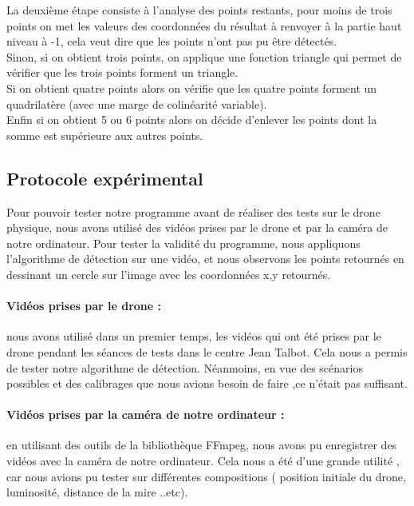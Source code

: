 \documentclass[12pt]{article}
\begin{document}
\begin{enumerate}
La deuxième étape consiste à l'analyse des points restants, pour moins de trois points on met les valeurs des coordonnées du résultat à renvoyer à la partie haut niveau à -1, cela veut dire que les points n'ont pas pu être détectés.\\
Sinon, si on obtient trois points, on applique une fonction triangle qui permet de vérifier que les trois points forment un triangle.\\
Si on obtient quatre points alors on vérifie que les quatre points forment un quadrilatère (avec une marge de colinéarité variable).\\ Enfin si on obtient 5 ou 6 points alors on décide d'enlever les points dont la somme est supérieure aux autres points.  

\end{enumerate}

\subsection{Protocole expérimental}
Pour pouvoir tester notre programme avant de réaliser des tests sur le drone physique, nous avons utilisé des vidéos prises par le drone et par la caméra de notre ordinateur. Pour tester la validité du programme, nous appliquons l'algorithme de détection sur une vidéo, et nous observons les points retournés en dessinant un cercle sur l'image avec les coordonnées x,y retournés.

\paragraph*{Vidéos prises par le drone : }
nous avons utilisé dans un premier temps, les vidéos qui ont été prises par le drone pendant les séances de tests dans le centre Jean Talbot. Cela nous a permis de tester notre algorithme de détection. Néanmoins, en vue des scénarios possibles et des calibrages que nous avions besoin de faire ,ce n'était pas suffisant. 

\paragraph*{Vidéos prises par la caméra de notre ordinateur : }
en utilisant des outils de la bibliothèque FFmpeg, nous avons pu enregistrer des vidéos avec la caméra de notre ordinateur. Cela nous a été d'une grande utilité , car nous avions pu tester sur différentes compositions ( position initiale du drone, luminosité, distance de la mire ..etc).
\end{document}
